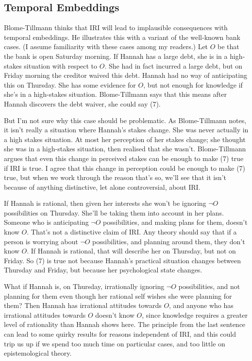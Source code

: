\subsection{Temporal Embeddings}
\noindent Blome-Tillmann thinks that IRI will lead to implausible consequences with temporal embeddings. He illustrates this with a variant of the well-known bank cases. (I assume familiarity with these cases among my readers.) Let $O$ be that the bank is open Saturday morning. If Hannah has a large debt, she is in a high-stakes situation with respect to $O$. She had in fact incurred a large debt, but on Friday morning the creditor waived this debt. Hannah had no way of anticipating this on Thursday. She has some evidence for $O$, but not enough for knowledge if she's in a high-stakes situation. Blome-Tillmann says that this means after Hannah discovers the debt waiver, she could say (7).


\noindent But I'm not sure why this case should be problematic. As Blome-Tillmann notes, it isn't really a situation where Hannah's stakes change. She was never actually in a high stakes situation. At most her perception of her stakes change; she thought she was in a high-stakes situation, then realised that she wasn't. Blome-Tillmann argues that even this change in perceived stakes can be enough to make (7) true if IRI is true. I agree that this change in perception could be enough to make (7) true, but when we work through the reason that's so, we'll see that it isn't because of anything distinctive, let alone controversial, about IRI.

If Hannah is rational, then given her interests she won't be ignoring $\neg O$ possibilities on Thursday. She'll be taking them into account in her plans. Someone who is anticipating $\neg O$ possibilities, and making plans for them, doesn't know $O$. That's not a distinctive claim of IRI. Any theory should say that if a person is worrying about $\neg O$ possibilities, and planning around them, they don't know $O$. If Hannah is rational, that will describe her on Thursday, but not on Friday. So (7) is true not because Hannah's practical situation changes between Thursday and Friday, but because her psychological state changes.

What if Hannah is, on Thursday, irrationally ignoring $\neg O$ possibilities, and not planning for them even though her rational self wishes she were planning for them? Then Hannah has irrational attitudes towards $O$, and anyone who has irrational attitudes towards $O$ doesn't know $O$, since knowledge requires a greater level of rationality than Hannah shows here. The principle from the last sentence can lead to some quirky results for reasons independent of IRI, and this could trip us up if we spend too much time on particular cases, and too little on epistemological theory. 

